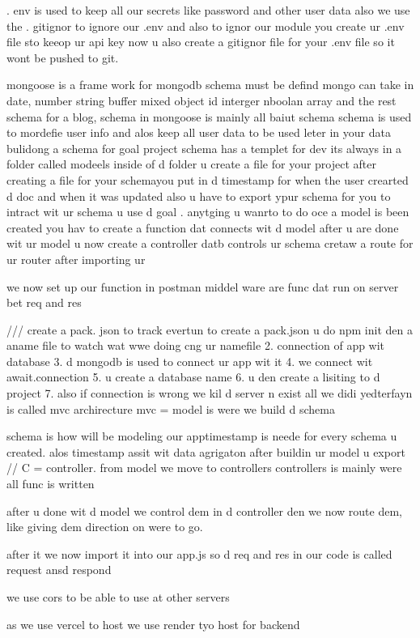 . env is used to keep all our secrets like password and other user data
also we use the . gitignor to ignore our .env and also to ignor our module
you create ur .env file sto keeop ur api key now u also create a gitignor file for your .env file so it wont 
 be pushed to git.

mongoose is a frame work for mongodb 
schema must be defind mongo can take in date, number string buffer mixed object id interger nboolan array and the rest
 schema for a blog, 
 schema in mongoose is mainly all baiut schema
 schema is used to mordefie user info and alos keep all user data to be used leter  in your data
 bulidong a schema for goal project schema has a templet for dev its always in a folder called modeels
 inside of d folder u create a file for your project
 after creating  a file for your schemayou put in d timestamp for when the user crearted d doc and when it was updated
 also u have to export ypur schema for you to intract wit ur schema u use d goal  . anytging u wanrto to do 
  oce a model is been created you hav to  create a function dat connects wit d model
  after u are done wit ur model u now create a controller datb controls ur schema
cretaw a route for ur router after importing ur 

 we now set up our function in postman 
 middel ware are func dat run on server bet req and res

 /// create a pack. json to track evertun to create a pack.json u do npm init
  den a aname file to watch wat wwe doing cng ur namefile 
  2. connection of app wit database  
  3. d mongodb is used to connect ur app wit it
  4. we connect wit await.connection
  5. u create a database name
 6. u den create a lisiting to d project
 7. also if connection is wrong we kil d server n exist
 all we didi yedterfayn is called mvc archirecture
 mvc =  model is were we build d schema

 schema is how will be modeling our apptimestamp is neede for every schema u created.
 alos timestamp assit wit data agrigaton
 after buildin ur model u  export 
 // C = controller. 
  from model we move to controllers 
  controllers is mainly were all  func is written 

  after u done wit d model we control dem in d controller den we now route dem, like giving dem direction on were to go.

  after it we now import it into our app.js 
  so d req and res in our code is called request ansd respond

  we use cors to be able to use at other servers
 
as we use vercel to host we use render tyo host for backend
